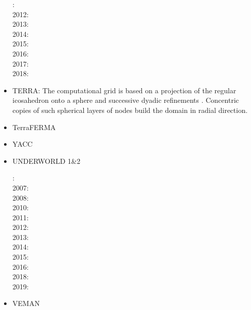 \begin{itemize}
: \cite{qube11}\cite{ellw11}\\
2012: \cite{buit12}\cite{tebu12}\cite{crsg12}\cite{grel12}\\
2013: \cite{ghbu13}\\
2014: \cite{ghbu14}\cite{qubu14}\\
2015: \cite{nabu15}\\
2016: \cite{zwsn16}\\
2017: \cite{nabp17}\\
2018: \cite{tebu18}











\item TERRA:
The computational grid is based on a projection of the regular icosahedron onto a 
sphere and successive dyadic refinements \cite{bafr85}.  Concentric copies of such  
spherical layers of nodes build the domain in radial direction.

\cite{baum83}
\cite{glat88}
\cite{buba95}
\cite{burb97}\cite{yang97}
\cite{burl98}
\cite{phbs09}\cite{wodd09}\cite{gows09}
\cite{woda11}
\cite{dadb13}
\cite{vade16}

\item TerraFERMA
\cite{wisv14}
\cite{wisv17}
\cite{spmw16}
\cite{ceww17}
\cite{ceww19}


\item YACC
\cite{tosn15}
\cite{tomy16}

\item UNDERWORLD 1\&2

: \cite{stfs06}\\
2007: \cite{moql07}\cite{stfs07}\\
2008: \cite{lemm08}\cite{ozrs08}\cite{gotc08}\\
2010: \cite{casm10}\cite{mamb10}\cite{stsf10}\cite{stfc10}\cite{fasm10}\\
2011: \cite{memm11}\cite{cafz11}\\
2012: \cite{cafa12}\\
2013: \cite{bemm13}\cite{scmo13}\cite{faca13}\cite{care13}\\
2014: \cite{famc14}\\
2015: \cite{quxm15}\cite{bemm15}\cite{scsp15}\cite{shmj15}\\
2016: \cite{shmv16}\cite{onlw16}\cite{kicf16}\\
2018: \cite{memm18}\\
2019: \cite{samo19}\cite{yamg19}\cite{canc19}

\item VEMAN
\cite{bepo10}


\end{itemize}
